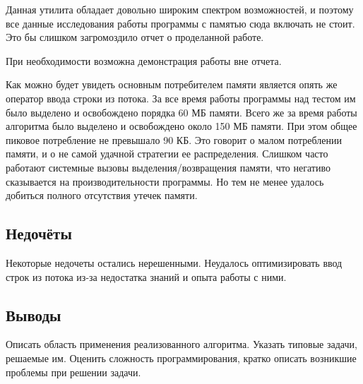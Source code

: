 \documentclass[12pt]{article}
\begin{document}
Данная утилита обладает довольно широким спектром возможностей, и поэтому все данные исследования работы программы с памятью сюда включать не стоит. Это бы слишком загромоздило отчет о проделанной работе.

При необходимости возможна демонстрация работы вне отчета.

Как можно будет увидеть основным потребителем памяти является опять же оператор ввода строки из потока.
За все время работы программы над тестом им было выделено и освобождено порядка 60 МБ памяти.
Всего же за время работы алгоритма было выделено и освобождено около 150 МБ памяти. При этом общее пиковое потребление не превышало 90 КБ. Это говорит о малом потреблении памяти, и о не самой удачной стратегии ее распределения. Слишком часто работают системные вызовы выделения/возвращения памяти, что негативо сказывается на производительности программы.
Но тем не менее удалось добиться полного отсутствия утечек памяти.

\subsection*{Недочёты}

Некоторые недочеты остались нерешенными. Неудалось оптимизировать ввод строк из потока из-за недостатка знаний и опыта работы с ними. 

\subsection*{Выводы}

Описать область применения реализованного алгоритма. Указать типовые
задачи, решаемые им. Оценить сложность программирования, кратко
описать возникшие проблемы при решении задачи. 
\end{document}
